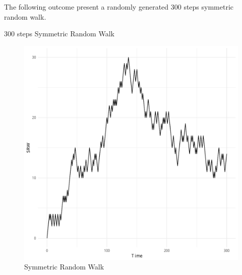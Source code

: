 \documentclass{article}\usepackage[]{graphicx}\usepackage[]{color}
\newenvironment{knitrout}{}{} %
\begin{document}
The following outcome present a randomly generated 300 steps symmetric random walk.

\begin{table}[h]

\caption{300 steps Symmetric Random Walk}
\end{table}


\begin{figure}[!h]
\begin{center}

\begin{knitrout}
\color{fgcolor}
\includegraphics[width=1\linewidth]{figure/unnamed-chunk-4-1} 

\end{knitrout}


\end{center}
\caption{Symmetric Random Walk}
\end{figure}
\end{document}
